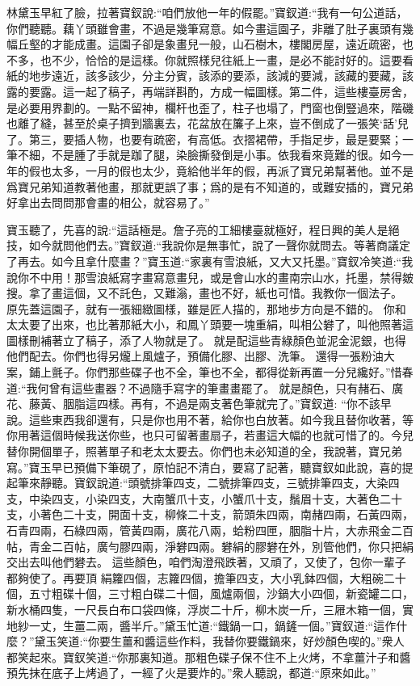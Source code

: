 \begin{parag}
    林黛玉早紅了臉，拉著寶釵說:“咱們放他一年的假罷。”寶釵道:“我有一句公道話，你們聽聽。藕丫頭雖會畫，不過是幾筆寫意。如今畫這園子，非離了肚子裏頭有幾幅丘壑的才能成畫。這園子卻是象畫兒一般，山石樹木，樓閣房屋，遠近疏密，也不多，也不少，恰恰的是這樣。你就照樣兒往紙上一畫，是必不能討好的。這要看紙的地步遠近，該多該少，分主分賓，該添的要添，該減的要減，該藏的要藏，該露的要露。這一起了稿子，再端詳斟酌，方成一幅圖樣。第二件，這些樓臺房舍，是必要用界劃的。一點不留神，欄杆也歪了，柱子也塌了，門窗也倒豎過來，階磯也離了縫，甚至於桌子擠到牆裏去，花盆放在簾子上來，豈不倒成了一張笑‘話’兒了。第三，要插人物，也要有疏密，有高低。衣摺裙帶，手指足步，最是要緊；一筆不細，不是腫了手就是跏了腿，染臉撕發倒是小事。依我看來竟難的很。如今一年的假也太多，一月的假也太少，竟給他半年的假，再派了寶兄弟幫著他。並不是爲寶兄弟知道教著他畫，那就更誤了事；爲的是有不知道的，或難安插的，寶兄弟好拿出去問問那會畫的相公，就容易了。”
\end{parag}


\begin{parag}
    寶玉聽了，先喜的說:“這話極是。詹子亮的工細樓臺就極好，程日興的美人是絕技，如今就問他們去。”寶釵道:“我說你是無事忙，說了一聲你就問去。等著商議定了再去。如今且拿什麼畫？”寶玉道:“家裏有雪浪紙，又大又托墨。”寶釵冷笑道:“我說你不中用！那雪浪紙寫字畫寫意畫兒，或是會山水的畫南宗山水，托墨，禁得皴搜。拿了畫這個，又不託色，又難滃，畫也不好，紙也可惜。我教你一個法子。
    原先蓋這園子，就有一張細緻圖樣，雖是匠人描的，那地步方向是不錯的。
    你和太太要了出來，也比著那紙大小，和鳳丫頭要一塊重絹，叫相公礬了，叫他照著這圖樣刪補著立了稿子，添了人物就是了。
    就是配這些青綠顏色並泥金泥銀，也得他們配去。你們也得另爖上風爐子，預備化膠、出膠、洗筆。
    還得一張粉油大案，鋪上氈子。你們那些碟子也不全，筆也不全，都得從新再置一分兒纔好。”惜春道:“我何曾有這些畫器？不過隨手寫字的筆畫畫罷了。
    就是顏色，只有赭石、廣花、藤黃、胭脂這四樣。再有，不過是兩支著色筆就完了。”寶釵道: “你不該早說。這些東西我卻還有，只是你也用不著，給你也白放著。如今我且替你收著，等你用著這個時候我送你些，也只可留著畫扇子，若畫這大幅的也就可惜了的。今兒替你開個單子，照著單子和老太太要去。你們也未必知道的全，我說著，寶兄弟寫。”寶玉早已預備下筆硯了，原怕記不清白，要寫了記著，聽寶釵如此說，喜的提起筆來靜聽。寶釵說道:“頭號排筆四支，二號排筆四支，三號排筆四支，大染四支，中染四支，小染四支，大南蟹爪十支，小蟹爪十支，鬚眉十支，大著色二十支，小著色二十支，開面十支，柳條二十支，箭頭朱四兩，南赭四兩，石黃四兩，石青四兩，石綠四兩，管黃四兩，廣花八兩，蛤粉四匣，胭脂十片，大赤飛金二百帖，青金二百帖，廣勻膠四兩，淨礬四兩。礬絹的膠礬在外，別管他們，你只把絹交出去叫他們礬去。
    這些顏色，咱們淘澄飛跌著，又頑了，又使了，包你一輩子都夠使了。再要頂 絹籮四個，志籮四個，擔筆四支，大小乳鉢四個，大粗碗二十個，五寸粗碟十個，三寸粗白碟二十個，風爐兩個，沙鍋大小四個，新瓷罐二口，新水桶四隻，一尺長白布口袋四條，浮炭二十斤，柳木炭一斤，三屜木箱一個，實地紗一丈，生薑二兩，醬半斤。”黛玉忙道:“鐵鍋一口，鍋鏟一個。”寶釵道:“這作什麼？”黛玉笑道:“你要生薑和醬這些作料，我替你要鐵鍋來，好炒顏色喫的。”衆人都笑起來。寶釵笑道:“你那裏知道。那粗色碟子保不住不上火烤，不拿薑汁子和醬預先抹在底子上烤過了，一經了火是要炸的。”衆人聽說，都道:“原來如此。”
\end{parag}


